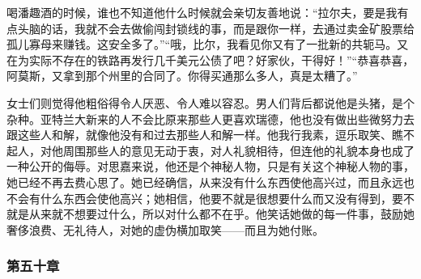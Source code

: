 \par 喝潘趣酒的时候，谁也不知道他什么时候就会亲切友善地说：“拉尔夫，要是我有点头脑的话，我就不会去做偷闯封锁线的事，而是跟你一样，去通过卖金矿股票给孤儿寡母来赚钱。这安全多了。”“哦，比尔，我看见你又有了一批新的共轭马。又在为实际不存在的铁路再发行几千美元公债了吧？好家伙，干得好！”“恭喜恭喜，阿莫斯，又拿到那个州里的合同了。你得买通那么多人，真是太糟了。”
\par 女士们则觉得他粗俗得令人厌恶、令人难以容忍。男人们背后都说他是头猪，是个杂种。亚特兰大新来的人不会比原来那些人更喜欢瑞德，他也没有做出些微努力去跟这些人和解，就像他没有和过去那些人和解一样。他我行我素，逗乐取笑、瞧不起人，对他周围那些人的意见无动于衷，对人礼貌相待，但连他的礼貌本身也成了一种公开的侮辱。对思嘉来说，他还是个神秘人物，只是有关这个神秘人物的事，她已经不再去费心思了。她已经确信，从来没有什么东西使他高兴过，而且永远也不会有什么东西会使他高兴；她相信，他要不就是很想要什么而又没有得到，要不就是从来就不想要过什么，所以对什么都不在乎。他笑话她做的每一件事，鼓励她奢侈浪费、无礼待人，对她的虚伪横加取笑——而且为她付账。

\subsubsection{第五十章}

